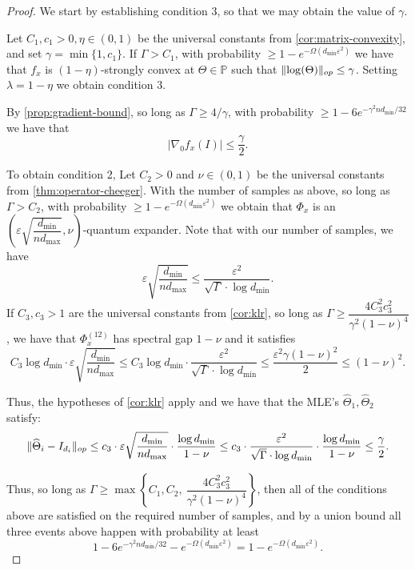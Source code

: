 \documentclass[aos]{imsart}
\theoremstyle{definition}
\numberwithin{equation}{section}
\DeclarePairedDelimiter{\norm}{\lVert}{\rVert}
\newcommand{\htheta}{\widehat{\Theta}}
\newcommand{\SPD}{\mathbb{P}}
\def\dmin{d_{\min}}
\def\dmax{d_{\max}}
\begin{document}
\begin{proof}
We start by establishing condition 3, so that we may obtain the value of $\gamma$.

\noindent Let $C_1, c_1 > 0, \eta \in (0,1)$ be the universal constants from \cref{cor:matrix-convexity}, and set $\gamma = \min\{1, c_1\}$. 
If $\Gamma > C_1$, with probability 
$\geq 1 - e^{- \Omega(\dmin \varepsilon^2)}$ we have that $f_x$ is
$(1-\eta)$-strongly convex at $\Theta \in \SPD$ such that 
$\norm{\log(\Theta)}_{op} \leq \gamma$. Setting $\lambda = 1-\eta$ we obtain condition 3.


By \cref{prop:gradient-bound}, so long as $\Gamma \geq 4/\gamma$, with probability $\geq 1 - 6 e^{- \gamma^2 n \dmin/32}$ we have that 
$$ |\nabla_0 f_x(I)| \leq  \frac{\gamma}{2}. $$ 

To obtain condition 2, Let $C_2 > 0$ and $\nu \in (0,1)$ be the universal constants from \cref{thm:operator-cheeger}.
With the number of samples as above, so long as $\Gamma > C_2$, with probability $\geq 1 - e^{- \Omega(\dmin \varepsilon^2)}$ we obtain that 
$\Phi_x$ is an $\left(\varepsilon \sqrt{\dfrac{\dmin}{n \dmax}}, \nu \right)$-quantum expander. Note that with our number of samples, we have
$$ \varepsilon \sqrt{\dfrac{\dmin}{n \dmax}} \leq \dfrac{\varepsilon^2}{\sqrt{\Gamma} \cdot \log \dmin}.  $$
If $C_3, c_3 > 1$ are the universal constants from \cref{cor:klr}, so long as 
$\Gamma \geq \dfrac{4 C_3^2 c_3^2}{\gamma^2 (1-\nu)^4}$, we have that
$\Phi_x^{(12)}$ has spectral gap $1 - \nu$ and it satisfies
$$ C_3 \log \dmin \cdot \varepsilon \sqrt{\dfrac{\dmin}{n \dmax}} \leq C_3 \log \dmin \cdot  \dfrac{\varepsilon^2}{\sqrt{\Gamma} \cdot \log \dmin} \leq \dfrac{\varepsilon^2 \gamma (1-\nu)^2}{2} \leq (1-\nu)^2. $$

Thus, the hypotheses of \cref{cor:klr} apply and we have that the MLE's $\htheta_1, \htheta_2$ satisfy: 
$$ \norm{\htheta_i - I_{d_i}}_{op} \leq c_3 \cdot \varepsilon \sqrt{\dfrac{\dmin}{n \dmax}} \cdot \dfrac{\log \dmin}{1-\nu} \leq c_3 \cdot \dfrac{\varepsilon^2}{\sqrt{\Gamma} \cdot \log \dmin} \cdot \dfrac{\log \dmin}{1-\nu} \leq \dfrac{\gamma}{2}. $$

Thus, so long as $\Gamma \geq \max\left\{ C_1, C_2, \ \dfrac{4 C_3^2 c_3^2}{\gamma^2 (1-\nu)^4}  \right\}$, then all of the conditions above are satisfied on the required number of samples, and by a union bound all three events above happen with probability at least
$$ 1 - 6 e^{- \gamma^2 n \dmin/32} - e^{- \Omega(\dmin \varepsilon^2)} = 1 - e^{- \Omega(\dmin \varepsilon^2)}. $$
\end{proof}
\end{document}
